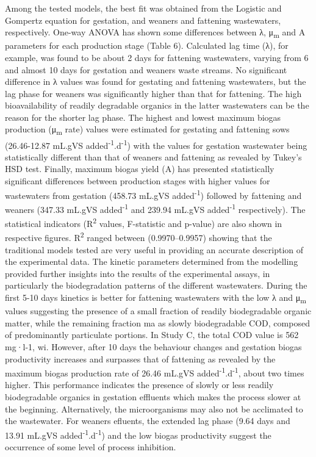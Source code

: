 Among the tested models, the best fit was obtained from the Logistic and Gompertz equation for gestation, and weaners and fattening wastewaters, respectively. One-way ANOVA has shown some differences between λ, μ\textsubscript{m} and A  parameters for each production stage (Table 6). Calculated lag time (λ), for example, was found to be about 2 days for fattening wastewaters, varying from 6 and almost 10 days for gestation and weaners waste streams. No significant difference in λ values was found for gestating and fattening wastewaters, but the lag phase for weaners was significantly higher than that for fattening. The high bioavailability of readily degradable organics in the latter wastewaters can be the reason for the shorter lag phase. The highest and lowest maximum biogas production (μ\textsubscript{m} rate) values were estimated for gestating and fattening sows (26.46-12.87 mL.gVS added\textsuperscript{-1}.d\textsuperscript{-1}) with the values for gestation wastewater being statistically different than that of weaners and fattening as revealed by Tukey’s HSD test. Finally, maximum biogas yield (A) has presented statistically significant differences between production stages with higher values for wastewaters from gestation (458.73 mL.gVS added\textsuperscript{-1}) followed by fattening and weaners (347.33 mL.gVS added\textsuperscript{-1} and 239.94 mL.gVS added\textsuperscript{-1} respectively). The statistical indicators (R\textsuperscript{2} values, F-statistic and p-value) are also shown in respective figures. R\textsuperscript{2} ranged between (0.9970–0.9957) showing that the traditional models tested are very useful in providing an accurate description of the experimental data. The kinetic parameters determined from the modelling provided further insights into the results of the experimental assays, in particularly the biodegradation patterns of the different wastewaters. During the first 5-10 days kinetics is better for fattening wastewaters with the low λ and μ\textsubscript{m} values suggesting the presence of a small fraction of readily biodegradable organic matter, while the
remaining fraction ma as slowly biodegradable COD,
composed of predominantly particulate portions.
In Study C, the total COD value is 562 mg·l-1, wi. However, after 10 days the behaviour changes and gestation biogas productivity increases and surpasses that of fattening as revealed by the maximum biogas production rate of 26.46 mL.gVS added\textsuperscript{-1}.d\textsuperscript{-1}, about two times higher. This performance indicates the presence of slowly or less readily  biodegradable organics in gestation effluents which makes the process slower at the beginning. Alternatively, the microorganisms may also not be acclimated to the wastewater. For weaners efluents, the extended lag phase (9.64 days and 13.91 mL.gVS added\textsuperscript{-1}.d\textsuperscript{-1}) and the low biogas productivity suggest the occurrence of some level of process inhibition.